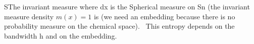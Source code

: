 SThe invariant measure where dx is the Spherical measure on Sn (the invariant measure density $m(x)=1$ is (we need an embedding because there is no probability measure on the chemical space). 
This entropy depends on the bandwidth h and on the embedding.
